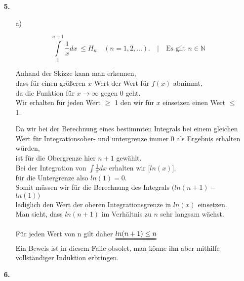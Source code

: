 \documentclass[a4paper,11pt]{article}
\begin{document}
\begin{enumerate}
        \item[\textbf{5.}]
            \begin{enumerate}

                \item[a)]

                    $$ \int\limits_{1}^{n+1}  \frac{1}{x} dx  \ \leq H_n \quad (n=1,2,...). \quad \Big| \quad \text{Es gilt }n \in \mathbb{N}$$




                Anhand der Skizze kann man erkennen,\\ dass für einen größeren $x$-Wert der Wert für $f(x)$ abnimmt, \\
                da die Funktion für  $x \rightarrow \infty$ gegen $0$ geht. \\
                Wir erhalten für jeden Wert $\geq$ 1 den wir für $x$ einsetzen einen Wert $\leq$ 1. 

                Da wir bei der Berechnung eines bestimmten Integrals bei einem gleichen Wert für Integrationsober- und untergrenze immer $0$ als Ergebnis erhalten würden, \\ ist für die Obergrenze hier $n+1$ gewählt. \\[0.3cm]
                Bei der Integration von $\int \frac{1}{x}dx$ erhalten wir $\Big[ln(x)\Big]$,\\ für die Untergrenze also $ln(1) = 0$. \\
                Somit müssen wir für die Berechnung des Integrals $ \Big(ln(n+1) -$ \sout{$ ln(1)$}$ \Big)$ \\ lediglich den Wert der oberen Integrationsgrenze in $ln(x)$ einsetzen. \\ 
                Man sieht, dass $ln(n+1)$ im Verhältnis zu $n$ sehr langsam wächst. \\ \\
                Für jeden Wert von n gilt daher $\uuline{ln(n+1) \leq n}$ \\
                Ein Beweis ist in diesem Falle obsolet, man könne ihn aber mithilfe vollständiger Induktion erbringen.


            \end{enumerate}


            \item[\textbf{6.}]
            \todo

    \end{enumerate}
\end{document}
